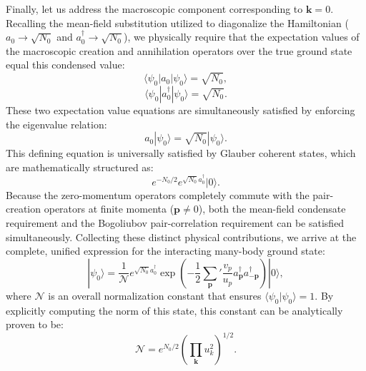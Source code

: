 Finally, let us address the macroscopic component corresponding to \( \mathbf{k} = 0 \). Recalling the mean-field substitution utilized to diagonalize the Hamiltonian (\( a_0 \to \sqrt{N_0} \) and \( a_0^\dagger \to \sqrt{N_0} \)), we physically require that the expectation values of the macroscopic creation and annihilation operators over the true ground state equal this condensed value:
\[
    \langle \psi_0 | a_0 | \psi_0 \rangle = \sqrt{N_0},
\]
\[
    \langle \psi_0 | a_0^\dagger | \psi_0 \rangle = \sqrt{N_0}.
\]
These two expectation value equations are simultaneously satisfied by enforcing the eigenvalue relation:
\[
    a_0 |\psi_0\rangle = \sqrt{N_0} |\psi_0\rangle.
\]
This defining equation is universally satisfied by Glauber coherent states, which are mathematically structured as:
\[
    e^{-N_0/2} e^{\sqrt{N_0} a_0^\dagger} |0\rangle.
\]
Because the zero-momentum operators completely commute with the pair-creation operators at finite momenta (\( \mathbf{p} \neq 0 \)), both the mean-field condensate requirement and the Bogoliubov pair-correlation requirement can be satisfied simultaneously. Collecting these distinct physical contributions, we arrive at the complete, unified expression for the interacting many-body ground state:
\begin{equation} \label{eq:interacting_ground_state}
    |\psi_0\rangle = \frac{1}{\mathcal{N}} e^{\sqrt{N_0} a_0^\dagger} \exp\left( -\frac{1}{2} \sum_{\mathbf{p}}' \frac{v_p}{u_p} a_{\mathbf{p}}^\dagger a_{-\mathbf{p}}^\dagger \right) |0\rangle,
\end{equation}
where \( \mathcal{N} \) is an overall normalization constant that ensures \( \langle \psi_0 | \psi_0 \rangle = 1 \). By explicitly computing the norm of this state, this constant can be analytically proven to be:
\[
    \mathcal{N} = e^{N_0/2} \left( \prod_{\mathbf{k}} u_k^2 \right)^{1/2}.
\]